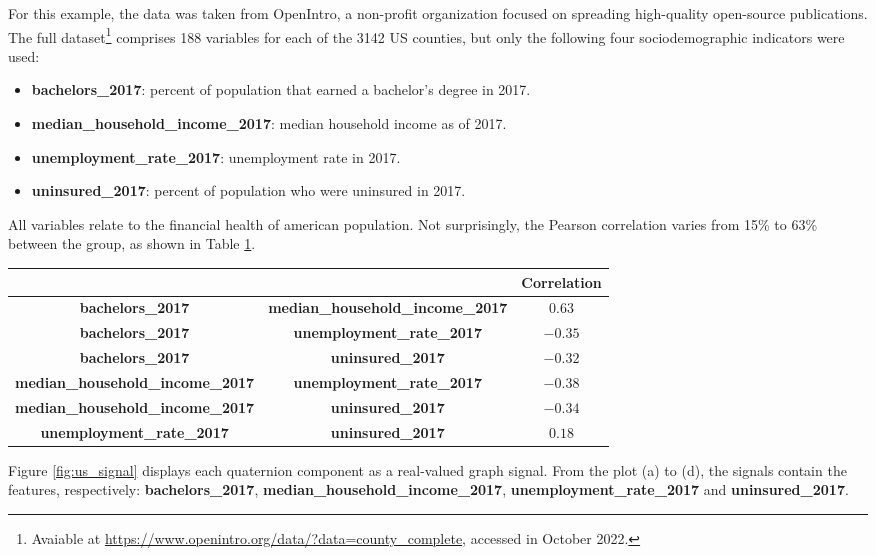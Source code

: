 For this example, the data was taken from OpenIntro, a non-profit organization focused on spreading high-quality open-source publications. The full dataset\footnote{Avaiable at \url{https://www.openintro.org/data/?data=county_complete}, accessed in October 2022.} comprises 188 variables for each of the 3142 US counties, but only the following four sociodemographic indicators were used:
\begin{itemize}[noitemsep]
    \item \textbf{bachelors\_2017}: percent of population that earned a bachelor's degree in 2017.
    \item \textbf{median\_household\_income\_2017}: median household income as of 2017.
    \item \textbf{unemployment\_rate\_2017}: unemployment rate in 2017.
    \item \textbf{uninsured\_2017}: percent of population who were uninsured in 2017.
\end{itemize}

All variables relate to the financial health of american population. Not surprisingly, the Pearson correlation varies from 15\% to 63\% between the group, as shown in Table \ref{tab:02}.
\begin{table}[!h]
\center
{}
\label{tab:02}
\begin{tabular*}{\textwidth}{ccc}
\toprule
& & \textbf{Correlation}\\
\midrule
\textbf{bachelors\_2017} & \textbf{median\_household\_income\_2017} & $0.63$ \\
\textbf{bachelors\_2017} & \textbf{unemployment\_rate\_2017} & $-0.35$ \\
\textbf{bachelors\_2017} & \textbf{uninsured\_2017} & $-0.32$ \\
\textbf{median\_household\_income\_2017} & \textbf{unemployment\_rate\_2017} & $-0.38$ \\
\textbf{median\_household\_income\_2017} & \textbf{uninsured\_2017} & $-0.34$ \\
\textbf{unemployment\_rate\_2017} & \textbf{uninsured\_2017} & $0.18$ \\
\bottomrule
\end{tabular*}
\end{table}

Figure \ref{fig:us_signal} displays each quaternion component as a real-valued graph signal. From the plot (a) to (d), the signals contain the features, respectively: \textbf{bachelors\_2017}, \textbf{median\_household\_income\_2017}, \textbf{unemployment\_rate\_2017} and \textbf{uninsured\_2017}.

